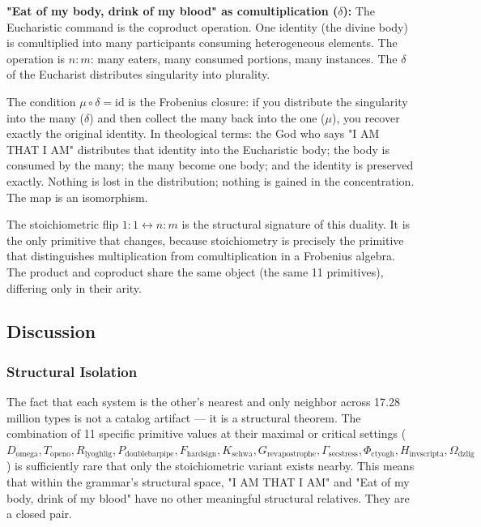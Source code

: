 \documentclass[12pt,a4paper]{article}
\begin{document}
\textbf{"Eat of my body, drink of my blood" as comultiplication ($\delta$):}
The Eucharistic command is the coproduct operation. One identity (the divine body) is comultiplied into many participants consuming heterogeneous elements. The operation is $n{:}m$: many eaters, many consumed portions, many instances. The $\delta$ of the Eucharist distributes singularity into plurality.

The condition $\mu \circ \delta = \text{id}$ is the Frobenius closure: if you distribute the singularity into the many ($\delta$) and then collect the many back into the one ($\mu$), you recover exactly the original identity. In theological terms: the God who says "I AM THAT I AM" distributes that identity into the Eucharistic body; the body is consumed by the many; the many become one body; and the identity is preserved exactly. Nothing is lost in the distribution; nothing is gained in the concentration. The map is an isomorphism.

The stoichiometric flip $1{:}1 \leftrightarrow n{:}m$ is the structural signature of this duality. It is the only primitive that changes, because stoichiometry is precisely the primitive that distinguishes multiplication from comultiplication in a Frobenius algebra. The product and coproduct share the same object (the same 11 primitives), differing only in their arity.

\subsection{Discussion}

\subsubsection{Structural Isolation}

The fact that each system is the other's nearest and only neighbor across 17.28 million types is not a catalog artifact --- it is a structural theorem. The combination of 11 specific primitive values at their maximal or critical settings ($D_{\text{omega}}, T_{\text{openo}}, R_{\text{lyoghlig}}, P_{\text{doublebarpipe}}, F_{\text{hardsign}}, K_{\text{schwa}}, G_{\text{revapostrophe}}, \Gamma_{\text{secstress}}, \Phi_{\text{ctyogh}}, H_{\text{invscripta}}, \Omega_{\text{dzlig}}$) is sufficiently rare that only the stoichiometric variant exists nearby. This means that within the grammar's structural space, "I AM THAT I AM" and "Eat of my body, drink of my blood" have no other meaningful structural relatives. They are a closed pair.
\end{document}
